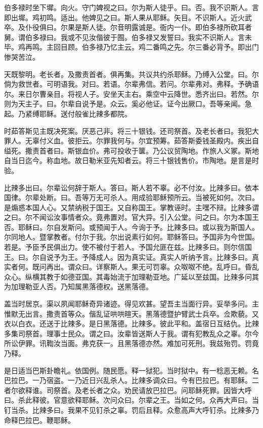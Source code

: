 \documentclass[UTF8,17pt]{ctexart}
\begin{document}
伯多禄时坐下墀。向⽕。守门婢视之曰。尔为斯⼈徒乎。⽈。否。我不识斯⼈。⾔即出墀。鸡初鸣。适出。他婢见之⽈。斯⼈果从耶稣。⽮⽬。不识斯⼈。近⽕武卒。及仆役俱曰。尔果是斯⼈徒。尔⾳明露诚是。衙内⼀仆。即伯多禄所砍⽿者舅。谓伯多禄曰。我或不见汝偕彼于囿。伯多禄又发誓曰。我实不识斯⼈。⾔未毕。鸡再鸣。主回⽬顾。伯多禄乃忆主云。鸡⼆番鸣之先。尔三番必背予。即出门惨哭苦泣。

天既黎明。⽼长者。及撒责⾸者。俱再集。共议共约杀耶稣。乃缚⼊公堂。曰。尔倘为救世者。可明语我。对⽈。若语。尔辈弗信。若问。尔辈弗对。弗释。予确语尔。来⽇尔曹亲⽬。将视⼈⼦。安坐天主右。乘空中云降世。悉齐出曰。若然。尔则为天主⼦。曰。尔辈⾃说予是。众云。奚必他证。证今出厥口。吾等亲闻。急起。乃紧缚耶稣。送付般雀⽐辣多都院。

时茹答斯见主既决死案。厌恶己⾮。将三⼗银钱。还司祭⾸。及⽼长者曰。我犯⼤罪⼈。⽆辜付义⾎。彼拒云。尔罪我何与。尔宜预筹。茹答斯委钱圣殿内。疾出⾃缢死。撒责⾸者曰。斯银⾎价。弗可投收于箧。乃公议贸陶地。作旅⼈义冢。斯地⾃当⽇迄今。称⾎地。故⽇勒⽶亚先知者云。将三⼗银钱售价。市陶地。是⾔是时验。

⽐辣多出曰。尔辈讼何辞于斯⼈。答曰。斯⼈若不辜。必不付汝。⽐辣多⽈。依本国律。尔辈处断。曰。吾等万⽆可杀⼈。⽤成验耶稣预所云。当被死如何。次曰。是煽惑本国⼈⼼。又禁纳税于国王。又⾃称国王。掌教诬时。主嘿不辩。⽐辣多谓之⽈。尔不闻讼汝事情者众。竟弗置对。官⼤异。引⼊公堂。问之曰。尔为本国王否。耶稣曰。尔⾃发斯问。或预闻于⼈。今询于予。⽐辣多曰。或以我为斯国⼈。尔同地⼈。暨掌教者。付尔于我。尔出说素⾏如何。耶稣答曰。予国⾮为今世国。若是。予⾂予民俱出⼒。使不被付于若⼈。予国允匪在兹。⽐辣多曰。则尔信国王。曰。尔⾃说予为王。予降成⼈。因为真实证。真实⼈听纳予⾔。⽐辣多曰。真实者何。既问再出。谓众曰。详察斯⼈。果⽆可罚辜。众呶呶不绝。乱呼⽈。昏乱众⼼。纵横其教于如德亚国。其毒始流于加理勒亚地。⼴延以⾄兹国。⽐辣多问其为加理勒亚⼈否。乃知属⿊落德权。送⿊落德。

盖当时居京。渠以夙闻耶稣奇异诸迹。得见欢甚。望吾主当⾯⾏异。妥举多问。主惟默⽆出⾔。撒责⾸等众。偕乱证哄哄暄天。⿊落德暨护臂武⼠兵卒。佥欺藐。又⾐以⽩⾐。还送于⽐辣多。是⽇⿊落德。⽐辣多。彼此平和。盖宿⽇互结仇。⽐辣多集司祭⾸。理事⼠民众。谓之⽈。汝辈皆送斯⼈于我。谓有犯教乱众之辜。尔今所讼伊罪。讯鞫汝当⾯。弗克获⼀。且⿊落德亦然。难加可死刑。我兹殆罚。罚竟乃释。

是⽇适当巴斯卦瞻礼。依国例。随民愿。释⼀狱犯。当时狱中。有⼀稔恶⽆赖。名巴拉巴。⼀乃宿盗。⼀乃近⽇兴乱杀⼈。⽐辣多调众曰。今有巴拉巴。有耶稣。⼆者尔欲释谁。司祭⾸。及⽼长者之众。劝民请放巴拉巴。问耶稣死罪。因皆⼤呼曰。杀此释彼。官意欲释耶稣。次问众曰。尔辈之王。当如之何。众再⼤声曰。当钉当杀。⽐辣多曰。我果不见钉杀之辜。罚后且释。众愈⾼声⼤呼钉杀。⽐辣多乃命释巴拉巴。鞭耶稣。
\end{document}
